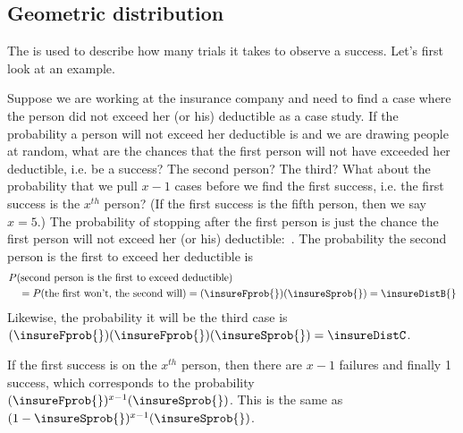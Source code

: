 


\subsection{Geometric distribution}


The 
is used to describe how
many trials it takes to observe a success.
Let's first look at an example.

\begin{examplewrap}
\begin{nexample}{Suppose we are working at the insurance
    company and need to find a case where the person did
    not exceed her (or his) deductible as a case study.
    If the probability a person will not exceed her
    deductible is \insureSprob{} and we are drawing people
    at random, what are the chances that the first person
    will not have exceeded her deductible, i.e. be a success?
    The second person?
    The third?
    What about the probability that we pull $x - 1$ cases before we find
    the first success, i.e. the first success is the
    $x^{th}$ person?
    (If the first success is the fifth person, then we say $x=5$.)}
  \label{waitForDeductible}%
  The probability of stopping after the first person is just
  the chance the first person will not exceed her (or his)
  deductible:~\insureSprob{}.
The probability the second person is the first to exceed
  her deductible is  \begin{align*}
  &P(\text{second person is the first to exceed deductible})  \\
  &\quad
    = P(\text{the first won't, the second will})
    = (\insureFprob{})(\insureSprob{})
    = \insureDistB{}
  \end{align*}
  Likewise, the probability it will be the third case is
  $(\insureFprob{})(\insureFprob{})(\insureSprob{})
    = \insureDistC$.

  If the first success is on the $x^{th}$ person,
  then there are $x-1$ failures and finally 1 success,
  which corresponds to the probability
  $(\insureFprob{})^{x-1}(\insureSprob{})$.
  This is the same as
  $(1-\insureSprob{})^{x-1}(\insureSprob{})$.
\end{nexample}
\end{examplewrap}

\D{\newpage}


